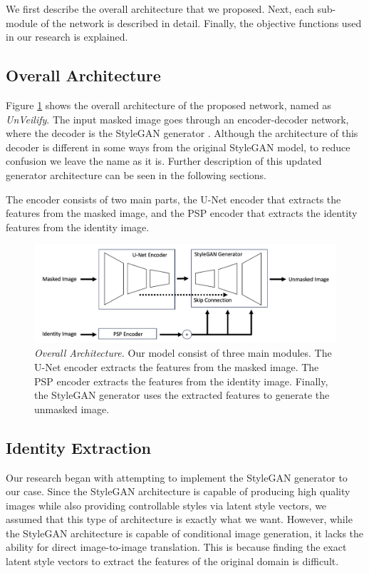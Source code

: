 \documentclass[sigconf,authorversion,nonacm]{acmart}
\begin{document}
We first describe the overall architecture that we proposed. Next, each sub-module
of the network is described in detail. Finally, the objective functions used in our
research is explained.

\subsection{Overall Architecture}
Figure \ref{images:model-architecture} shows the overall architecture of the proposed network, named as \emph{UnVeilify}. The input
masked image goes through an encoder-decoder network, where the decoder is the StyleGAN generator
\cite{StyleGAN}. Although the architecture of this decoder is different in some ways from the
original StyleGAN model, to reduce confusion we leave the name as it is. Further description of this
updated generator architecture can be seen in the following sections.

The encoder consists of two main parts, the U-Net encoder that extracts the features from the masked image, and the PSP encoder that extracts the identity features from the identity image.

\begin{figure}
  \centering
  \includegraphics[width=0.8\linewidth]{images/model-architecture.png}
  \caption{\emph{Overall Architecture.} Our model consist of three main modules. The U-Net encoder extracts
  the features from the masked image. The PSP encoder extracts the features from the identity image. Finally,
the StyleGAN generator uses the extracted features to generate the unmasked image.}
  \label{images:model-architecture}
\end{figure}

\subsection{Identity Extraction}
Our research began with attempting to implement the StyleGAN generator to our case. Since the
StyleGAN architecture is capable of producing high quality images while also providing controllable
styles via latent style vectors, we assumed that this type of architecture is exactly what we want.
However, while the StyleGAN architecture is capable of conditional image generation, it lacks the
ability for direct image-to-image translation. This is because finding the exact
latent style vectors to extract the features of the original domain is difficult.
\end{document}
